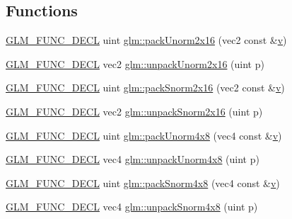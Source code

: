 \subsection*{Functions}
\begin{DoxyCompactItemize}
\item 
\mbox{\hyperlink{setup_8hpp_ab2d052de21a70539923e9bcbf6e83a51}{G\+L\+M\+\_\+\+F\+U\+N\+C\+\_\+\+D\+E\+CL}} uint \mbox{\hyperlink{group__core__func__packing_ga0659ddaf09727551c7bf51655d2a65cf}{glm\+::pack\+Unorm2x16}} (vec2 const \&\mbox{\hyperlink{glad_8h_a14cfbe2fc2234f5504618905b69d1e06}{v}})
\item 
\mbox{\hyperlink{setup_8hpp_ab2d052de21a70539923e9bcbf6e83a51}{G\+L\+M\+\_\+\+F\+U\+N\+C\+\_\+\+D\+E\+CL}} vec2 \mbox{\hyperlink{group__core__func__packing_ga11776a74e1885a14e1295d6e917a9ae2}{glm\+::unpack\+Unorm2x16}} (uint p)
\item 
\mbox{\hyperlink{setup_8hpp_ab2d052de21a70539923e9bcbf6e83a51}{G\+L\+M\+\_\+\+F\+U\+N\+C\+\_\+\+D\+E\+CL}} uint \mbox{\hyperlink{group__core__func__packing_ga0c8005de240d6c4ca3d16c7bee25c622}{glm\+::pack\+Snorm2x16}} (vec2 const \&\mbox{\hyperlink{glad_8h_a14cfbe2fc2234f5504618905b69d1e06}{v}})
\item 
\mbox{\hyperlink{setup_8hpp_ab2d052de21a70539923e9bcbf6e83a51}{G\+L\+M\+\_\+\+F\+U\+N\+C\+\_\+\+D\+E\+CL}} vec2 \mbox{\hyperlink{group__core__func__packing_gae5f30f599243df9525315edecae09a7f}{glm\+::unpack\+Snorm2x16}} (uint p)
\item 
\mbox{\hyperlink{setup_8hpp_ab2d052de21a70539923e9bcbf6e83a51}{G\+L\+M\+\_\+\+F\+U\+N\+C\+\_\+\+D\+E\+CL}} uint \mbox{\hyperlink{group__core__func__packing_ga834ee9a9e73dcb0a7c1fc88143f3edb8}{glm\+::pack\+Unorm4x8}} (vec4 const \&\mbox{\hyperlink{glad_8h_a14cfbe2fc2234f5504618905b69d1e06}{v}})
\item 
\mbox{\hyperlink{setup_8hpp_ab2d052de21a70539923e9bcbf6e83a51}{G\+L\+M\+\_\+\+F\+U\+N\+C\+\_\+\+D\+E\+CL}} vec4 \mbox{\hyperlink{group__core__func__packing_ga1ec646af4b27982d175672bddd642792}{glm\+::unpack\+Unorm4x8}} (uint p)
\item 
\mbox{\hyperlink{setup_8hpp_ab2d052de21a70539923e9bcbf6e83a51}{G\+L\+M\+\_\+\+F\+U\+N\+C\+\_\+\+D\+E\+CL}} uint \mbox{\hyperlink{group__core__func__packing_gafcf25acc0d361c6c696a433aa5dfd16b}{glm\+::pack\+Snorm4x8}} (vec4 const \&\mbox{\hyperlink{glad_8h_a14cfbe2fc2234f5504618905b69d1e06}{v}})
\item 
\mbox{\hyperlink{setup_8hpp_ab2d052de21a70539923e9bcbf6e83a51}{G\+L\+M\+\_\+\+F\+U\+N\+C\+\_\+\+D\+E\+CL}} vec4 \mbox{\hyperlink{group__core__func__packing_ga4b18a0480e7260401d97f40cacd6bc36}{glm\+::unpack\+Snorm4x8}} (uint p)

\end{DoxyCompactItemize}
